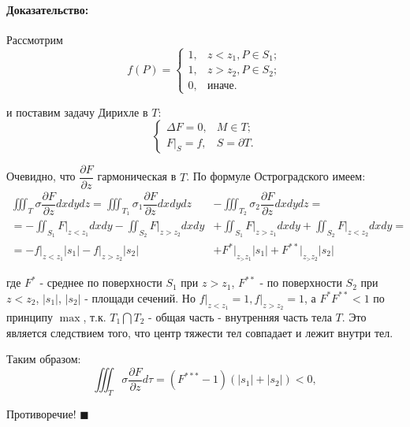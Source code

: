 \documentclass{article}
\newenvironment{proof}{\paragraph{Доказательство:}}{\hfill$\blacksquare$}
\begin{document}
\begin{proof}
Рассмотрим 
\begin{equation*}
f(P) = 
	\begin{cases}
		1, & z < z_1, P \in S_1;\\
		1, & z > z_2, P \in S_2;\\
		0, & \text{иначе}.
	\end{cases}
\end{equation*}

и поставим задачу Дирихле в $T$:
\begin{equation*}
\begin{cases}
	\Delta F = 0, & M \in T;\\
	F \bigg|_S = f, & S = \partial T.
\end{cases}
\end{equation*}

Очевидно, что $\dfrac{\partial F}{\partial z}$ гармоническая в $T$. 
По формуле Остроградского имеем:
\begin{equation*}
\begin{split}
	\iiint_T \sigma \dfrac{\partial F}{\partial z} dx dy dz = 
	\iiint_{T_1} \sigma_1 \dfrac{\partial F}{\partial z} dx dy dz &- 
	\iiint_{T_2} \sigma_2 \dfrac{\partial F}{\partial z} dx dy dz=\\
	= - \iint_{S_1} F \bigg|_{z<z_1} dx dy - \iint_{S_2} F \bigg|_{z>z_2} dx dy &+
	\iint_{S_1} F \bigg|_{z>z_1} dx dy + \iint_{S_2} F \bigg|_{z<z_2} dx dy = \\
	= -f \bigg|_{z<z_1}|s_1| - f \bigg|_{z > z_2} |s_2| &+ F^* \bigg|_{z_>z_1} |s_1| + F^{**} \bigg|_{z_>z_2} |s_2|
\end{split}
\end{equation*}

где $F^*$ - среднее по поверхности $S_1$ при $z > z_1$, $F^{**}$ - по поверхности $S_2$ при $z <z_2$, $|s_1|$, $|s_2|$ - площади сечений. 
Но $f \bigg|_{z<z_1} = 1, f \bigg|_{z>z_2} = 1$, а $F^* F^{**} < 1$ по принципу $\max$, т.к. $T_1 \bigcap T_2$ - общая часть - внутренняя часть тела $T$. 
Это является следствием того, что центр тяжести тел совпадает и лежит внутри тел.

Таким образом:
\begin{equation*}
	\iiint_T \sigma \dfrac{\partial F}{\partial z} d \tau = (F^{***} -1)(|s_1| + |s_2|) < 0,
\end{equation*}

Противоречие!
\end{proof}
\end{document}

